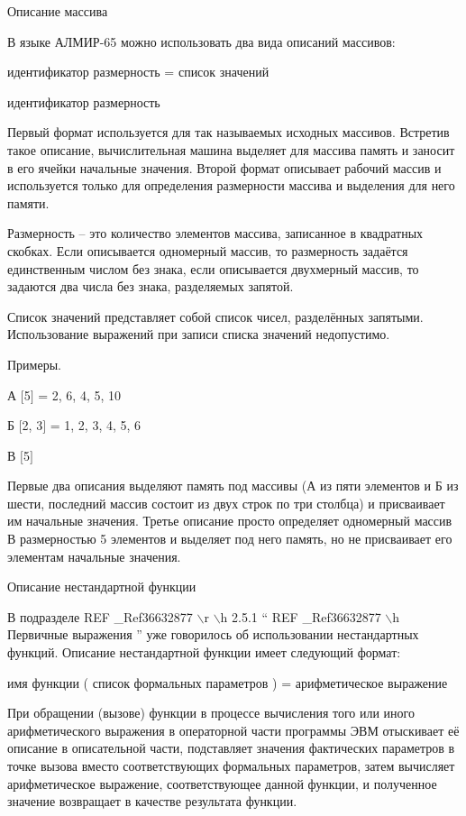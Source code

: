 \documentclass[11pt]{article}
\begin{document}
Описание массива

В языке АЛМИР-65 можно использовать два
вида описаний массивов:

идентификатор размерность = список
значений

идентификатор размерность

Первый формат используется для так
называемых исходных массивов. Встретив
такое описание, вычислительная машина
выделяет для массива память и заносит в
его ячейки начальные значения. Второй
формат описывает рабочий массив и
используется только для определения
размерности массива и выделения для
него памяти.

Размерность – это количество
элементов массива, записанное в
квадратных скобках. Если описывается
одномерный массив, то размерность
задаётся единственным числом без
знака, если описывается двухмерный
массив, то задаются два числа без знака,
разделяемых запятой.

Список значений представляет собой
список чисел, разделённых запятыми.
Использование выражений при записи
списка значений недопустимо.

Примеры.

А $[$5$]$ = 2, 6, 4, 5, 10

Б $[$2, 3$]$ = 1, 2, 3, 4, 5, 6

В $[$5$]$

Первые два описания выделяют память
под массивы (А из пяти элементов и Б из
шести, последний массив состоит из двух
строк по три столбца) и присваивает им
начальные значения. Третье описание
просто определяет одномерный массив В
размерностью 5 элементов и выделяет под
него память, но не присваивает его
элементам начальные значения.

Описание нестандартной функции

В подразделе   REF \_Ref36632877 $\backslash$r $\backslash$h 
2.5.1  “  REF \_Ref36632877 $\backslash$h  Первичные
выражения ” уже говорилось об
использовании нестандартных функций.
Описание нестандартной функции имеет
следующий формат:

имя функции ( список формальных
параметров ) = арифметическое выражение

При обращении (вызове) функции в
процессе вычисления того или иного
арифметического выражения в
операторной части программы ЭВМ
отыскивает её описание в описательной
части, подставляет значения
фактических параметров в точке вызова
вместо соответствующих формальных
параметров, затем вычисляет
арифметическое выражение,
соответствующее данной функции, и
полученное значение возвращает в
качестве результата функции.
\end{document}
